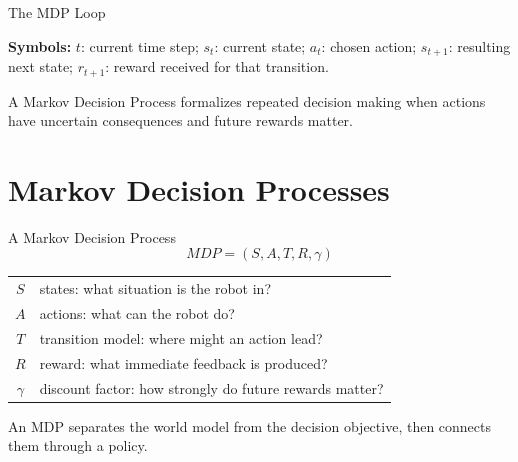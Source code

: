 \documentclass[aspectratio=169,10pt]{beamer}
\newcommand{\equationlegend}[1]{%
  \par\smallskip
  \begingroup
    \setlength{\fboxsep}{4pt}%
    \noindent\colorbox{DeckSoft}{%
      \parbox{\dimexpr\linewidth-2\fboxsep\relax}{%
        \footnotesize\textbf{Symbols:} #1%
      }%
    }\par
  \endgroup
  \smallskip
}
\begin{document}
\begin{frame}[shrink=10]{The MDP Loop}
  \begin{center}
  \end{center}
  \equationlegend{$t$: current time step; $s_t$: current state; $a_t$: chosen action; $s_{t+1}$: resulting next state; $r_{t+1}$: reward received for that transition.}

  \begin{keyidea}
    A Markov Decision Process formalizes repeated decision making when actions have uncertain consequences and future rewards matter.
  \end{keyidea}
\end{frame}

\section{Markov Decision Processes}

\begin{frame}[shrink=10]{A Markov Decision Process}
  \[
    \boxed{MDP=(S,A,T,R,\gamma)}
  \]

  \begin{center}
    \renewcommand{\arraystretch}{1.3}
    \begin{tabular}{c|p{}}
      $S$ & states: what situation is the robot in? \\
      $A$ & actions: what can the robot do? \\
      $T$ & transition model: where might an action lead? \\
      $R$ & reward: what immediate feedback is produced? \\
      $\gamma$ & discount factor: how strongly do future rewards matter? \\
    \end{tabular}
  \end{center}

  \begin{keyidea}
    An MDP separates the world model from the decision objective, then connects them through a policy.
  \end{keyidea}
\end{frame}
\end{document}
